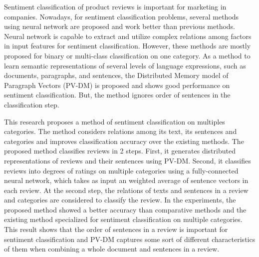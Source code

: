 Sentiment classification of product reviews is important
for marketing in companies.
%
Nowadays, for sentiment classification problems,
several methods using neural network are proposed
and work better than previous methods.
Neural network is capable to extract and utilize complex relations
among factors in input features for sentiment classification.
However, these methods are mostly proposed
for binary or multi-class classification on one category.
%
As a method to learn semantic representations of several levels
of language expressions, such as documents, paragraphs, and sentences,
the Distributed Memory model of Paragraph Vectors (PV-DM) is proposed
and shows good performance on sentiment classification.
But, the method ignores order of sentences in the classification step.

This research proposes a method of sentiment classification
on multiples categories.
The method considers relations among its text, its sentences and categories
and improves classification accuracy over the existing methods.
%
The proposed method classifies reviews in 2 steps.
First, it generates distributed representations of reviews
and their sentences using PV-DM.
Second, it classifies reviews into degrees of ratings
on multiple categories using a fully-connected neural network,
which takes as input an weighted average of
sentence vectors in each review.
At the second step, the relations of texts and sentences in a review
and categories are considered to classify the review.
%
In the experiments, the proposed method showed a better accuracy
than comparative methods and the existing method specialized
for sentiment classification on multiple categories.
This result shows that
the order of sentences in a review is important for sentiment classification
and PV-DM captures some sort of different characteristics of them
when combining a whole document and sentences in a review.
